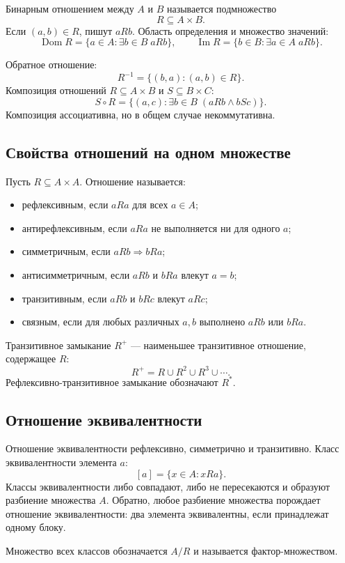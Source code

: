 Бинарным отношением между $A$ и $B$ называется подмножество
\[
    R\subseteq A\times B.
\]
Если $(a,b)\in R$, пишут $aRb$. Область определения и множество значений:
\[
\operatorname{Dom}R=\{a\in A:\exists b\in B\;aRb\},
\qquad
\operatorname{Im}R=\{b\in B:\exists a\in A\;aRb\}.
\]

Обратное отношение:
\[
    R^{-1}=\{(b,a):(a,b)\in R\}.
\]
Композиция отношений $R\subseteq A\times B$ и $S\subseteq B\times C$:
\[
    S\circ R=
    \{(a,c):\exists b\in B\;(aRb\land bSc)\}.
\]
Композиция ассоциативна, но в общем случае некоммутативна.

\subsection{Свойства отношений на одном множестве}

Пусть $R\subseteq A\times A$. Отношение называется:
\begin{itemize}
    \item рефлексивным, если $aRa$ для всех $a\in A$;
    \item антирефлексивным, если $aRa$ не выполняется ни для одного $a$;
    \item симметричным, если $aRb\Rightarrow bRa$;
    \item антисимметричным, если $aRb$ и $bRa$ влекут $a=b$;
    \item транзитивным, если $aRb$ и $bRc$ влекут $aRc$;
    \item связным, если для любых различных $a,b$ выполнено $aRb$ или $bRa$.
\end{itemize}

Транзитивное замыкание $R^+$ --- наименьшее транзитивное отношение,
содержащее $R$:
\[
    R^+=R\cup R^2\cup R^3\cup\cdots.
\]
Рефлексивно-транзитивное замыкание обозначают $R^*$.

\subsection{Отношение эквивалентности}

Отношение эквивалентности рефлексивно, симметрично и транзитивно. Класс
эквивалентности элемента $a$:
\[
    [a]=\{x\in A:xRa\}.
\]
Классы эквивалентности либо совпадают, либо не пересекаются и образуют разбиение
множества $A$. Обратно, любое разбиение множества порождает отношение
эквивалентности: два элемента эквивалентны, если принадлежат одному блоку.

Множество всех классов обозначается $A/R$ и называется фактор-множеством.

